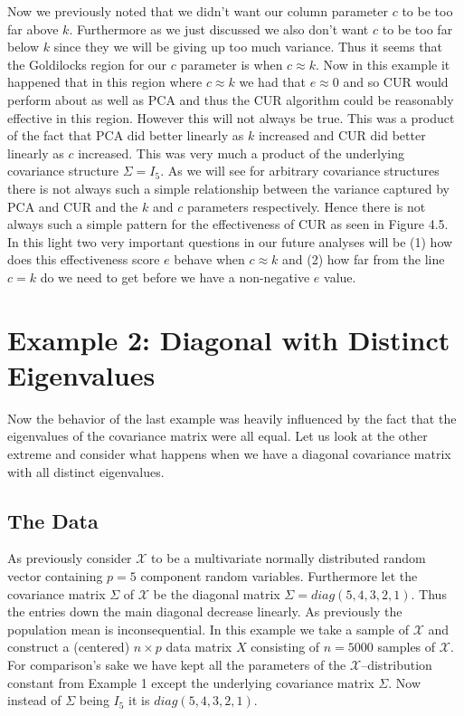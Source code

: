 \documentclass{book}
\newcommand{\bs}[1]{\boldsymbol{#1}}
\newcommand{\rv}[1]{\bs{\mathscr{#1}}}
\begin{document}
Now we previously noted that we didn't want our column parameter $c$ to be too far above $k$. Furthermore as we just discussed we also don't want $c$ to be too far below $k$ since they we will be giving up too much variance. Thus it seems that the Goldilocks region for our $c$ parameter is when $c \approx k$. Now in this example it happened that in this region where $c\approx k$ we had that $e \approx 0$ and so CUR would perform about as well as PCA and thus the CUR algorithm could be reasonably effective in this region. However this will not always be true. This was a product of the fact that PCA did better linearly as $k$ increased and CUR did better linearly as $c$ increased. This was very much a product of the underlying covariance structure $\Sigma=I_5$. As we will see for arbitrary covariance structures there is not always such a simple relationship between the variance captured by PCA and CUR and the $k$ and $c$ parameters respectively. Hence there is not always such a simple pattern for the effectiveness of CUR as seen in Figure 4.5. In this light two very important questions in our future analyses will be (1) how does this effectiveness score $e$ behave when $c \approx k$ and (2) how far from the line $c=k$ do we need to get before we have a non-negative $e$ value. 



\newpage 
\section{Example 2: Diagonal with Distinct Eigenvalues}

Now the behavior of the last example was heavily influenced by the fact that the eigenvalues of the covariance matrix were all equal. Let us look at the other extreme and consider what happens when we have a diagonal covariance matrix with all distinct eigenvalues. 

\subsection{The Data}


As previously consider $\rv{X}$ to be a multivariate normally distributed random vector containing $p=5$ component random variables. Furthermore let the covariance matrix $\Sigma$ of $\rv{X}$ be the diagonal matrix $\Sigma=diag(5,4,3,2,1)$. Thus the entries down the main diagonal decrease linearly. As previously the population mean is inconsequential. In this example we take a sample of $\rv{X}$ and construct a (centered) $n\times p$ data matrix $X$ consisting of $n=5000$ samples of $\rv{X}$. For comparison's sake we have kept all the parameters of the $\rv{X}$--distribution constant from Example 1 except the underlying covariance matrix $\Sigma$. Now instead of $\Sigma$ being $I_5$ it is $diag(5,4,3,2,1)$. 
\end{document}
